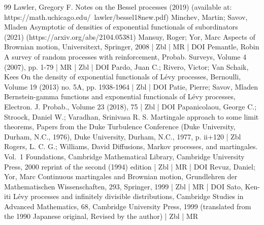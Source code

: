 \documentclass[10pt]{amsart}
\theoremstyle{definition}\newtheorem{defi}[theo]{Definition}\newtheorem{rema}[theo]{Remark}\newtheorem{exam}[theo]{Example}\newtheorem{exem}[theo]{Example}\newtheorem{nota}[theo]{Notation}
\begin{document}
\begin{thebibliography}{99}
Lawler, Gregory F. Notes on the Bessel processes (2019) (available at: https://math.uchicago.edu/~lawler/bessel18new.pdf)
Minchev, Martin; Savov, Mladen Asymptotic of densities of exponential functionals of subordinators (2021) (https://arxiv.org/abs/2104.05381)
Mansuy, Roger; Yor, Marc Aspects of Brownian motion, Universitext, Springer, 2008 | Zbl | MR | DOI
Pemantle, Robin A survey of random processes with reinforcement, Probab. Surveys, Volume 4 (2007), pp. 1-79 | MR | Zbl | DOI
Pardo, Juan C.; Rivero, Victor; Van Schaik, Kees On the density of exponential functionals of Lévy processes, Bernoulli, Volume 19 (2013) no. 5A, pp. 1938-1964 | Zbl | DOI
Patie, Pierre; Savov, Mladen Bernstein-gamma functions and exponential functionals of Lévy processes, Electron. J. Probab., Volume 23 (2018), 75 | Zbl | DOI
Papanicolaou, George C.; Stroock, Daniel W.; Varadhan, Srinivasa R. S. Martingale approach to some limit theorems, Papers from the Duke Turbulence Conference (Duke University, Durham, N.C., 1976), Duke University, Durham, N.C., 1977, p. ii+120 | Zbl
Rogers, L. C. G.; Williams, David Diffusions, Markov processes, and martingales. Vol. 1 Foundations, Cambridge Mathematical Library, Cambridge University Press, 2000 reprint of the second (1994) edition | Zbl | MR | DOI
Revuz, Daniel; Yor, Marc Continuous martingales and Brownian motion, Grundlehren der Mathematischen Wissenschaften, 293, Springer, 1999 | Zbl | MR | DOI
Sato, Ken-iti Lévy processes and infinitely divisible distributions, Cambridge Studies in Advanced Mathematics, 68, Cambridge University Press, 1999 (translated from the 1990 Japanese original, Revised by the author) | Zbl | MR
\end{thebibliography}
\end{document}
